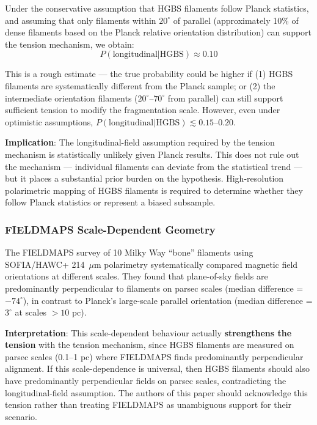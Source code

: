 \documentclass[11pt,a4paper]{article}
\begin{document}
Under the conservative assumption that HGBS filaments follow Planck statistics, and assuming that only filaments within $20^\circ$ of parallel (approximately 10\% of dense filaments based on the Planck relative orientation distribution) can support the tension mechanism, we obtain:
\begin{equation}
P(\text{longitudinal}|\text{HGBS}) \approx 0.10
\end{equation}

This is a rough estimate — the true probability could be higher if (1) HGBS filaments are systematically different from the Planck sample; or (2) the intermediate orientation filaments ($20^\circ$--$70^\circ$ from parallel) can still support sufficient tension to modify the fragmentation scale. However, even under optimistic assumptions, $P(\text{longitudinal}|\text{HGBS}) \lesssim 0.15$--$0.20$.

\textbf{Implication}: The longitudinal-field assumption required by the tension mechanism is statistically unlikely given Planck results. This does not rule out the mechanism — individual filaments can deviate from the statistical trend — but it places a substantial prior burden on the hypothesis. High-resolution polarimetric mapping of HGBS filaments is required to determine whether they follow Planck statistics or represent a biased subsample.

\subsubsection{FIELDMAPS Scale-Dependent Geometry}

The FIELDMAPS survey of 10 Milky Way ``bone'' filaments \citep{Coude2025} using SOFIA/HAWC+ 214~$\mu$m polarimetry systematically compared magnetic field orientations at different scales. They found that plane-of-sky fields are predominantly perpendicular to filaments on parsec scales (median difference = $-74^{\circ}$), in contrast to Planck's large-scale parallel orientation (median difference = $3^{\circ}$ at scales $>10$ pc).

\textbf{Interpretation}: This scale-dependent behaviour actually \textbf{strengthens the tension} with the tension mechanism, since HGBS filaments are measured on parsec scales (0.1--1 pc) where FIELDMAPS finds predominantly perpendicular alignment. If this scale-dependence is universal, then HGBS filaments should also have predominantly perpendicular fields on parsec scales, contradicting the longitudinal-field assumption. The authors of this paper should acknowledge this tension rather than treating FIELDMAPS as unambiguous support for their scenario.
\end{document}
